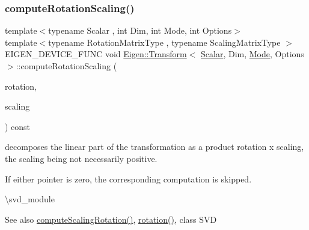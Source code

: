 \subsubsection{\texorpdfstring{computeRotationScaling()}{computeRotationScaling()}}
{\footnotesize\ttfamily template$<$typename Scalar , int Dim, int Mode, int Options$>$ \\
template$<$typename Rotation\+Matrix\+Type , typename Scaling\+Matrix\+Type $>$ \\
E\+I\+G\+E\+N\+\_\+\+D\+E\+V\+I\+C\+E\+\_\+\+F\+U\+NC void \mbox{\hyperlink{class_eigen_1_1_transform}{Eigen\+::\+Transform}}$<$ \mbox{\hyperlink{class_eigen_1_1_transform_a4e69ced9d651745b8ed4eda46f41795d}{Scalar}}, Dim, \mbox{\hyperlink{struct_mode}{Mode}}, Options $>$\+::compute\+Rotation\+Scaling (\begin{DoxyParamCaption}\item[{Rotation\+Matrix\+Type $\ast$}]{rotation,  }\item[{Scaling\+Matrix\+Type $\ast$}]{scaling }\end{DoxyParamCaption}) const}

decomposes the linear part of the transformation as a product rotation x scaling, the scaling being not necessarily positive.

If either pointer is zero, the corresponding computation is skipped.

\textbackslash{}svd\+\_\+module

\begin{DoxySeeAlso}{See also}
\mbox{\hyperlink{class_eigen_1_1_transform_a88f214d6340a4ced22d673d54661e16c}{compute\+Scaling\+Rotation()}}, \mbox{\hyperlink{class_eigen_1_1_transform_a87eb429e076e2c15a1bfbe99b43ae07c}{rotation()}}, class S\+VD 
\end{DoxySeeAlso}
\mbox{\label{class_eigen_1_1_transform_a88f214d6340a4ced22d673d54661e16c}} 
